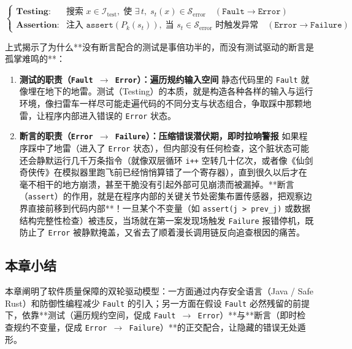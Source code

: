 \documentclass[a4paper]{article}
\begin{document}
\begin{equation}
\begin{cases}
\textbf{Testing}: & \text{搜索 } x \in \mathcal{I}_{\mathrm{test}}, \;\text{使 } \exists\, t,\; s_t(x) \in \mathcal{S}_{\mathrm{error}} \quad (\mathtt{Fault \to Error}) \\[6pt]
\textbf{Assertion}: & \text{注入 } \mathtt{assert}(P_k(s_t)), \;\text{当 } s_t \in \mathcal{S}_{\mathrm{error}} \text{ 时触发异常} \quad (\mathtt{Error \to Failure})
\end{cases}
\end{equation}

上式揭示了为什么**没有断言配合的测试是事倍功半的，而没有测试驱动的断言是孤掌难鸣的**：
\begin{enumerate}
    \item \textbf{测试的职责（\texttt{Fault $\to$ Error}）：遍历规约输入空间}
    静态代码里的 \texttt{Fault} 就像埋在地下的地雷。测试（Testing）的本质，就是构造各种各样的输入与运行环境，像扫雷车一样尽可能走遍代码的不同分支与状态组合，争取踩中那颗地雷，让程序内部进入错误的 \texttt{Error} 状态。
    \item \textbf{断言的职责（\texttt{Error $\to$ Failure}）：压缩错误潜伏期，即时拉响警报}
    如果程序踩中了地雷（进入了 \texttt{Error} 状态），但内部没有任何检查，这个脏状态可能还会静默运行几千万条指令（就像双层循环 \texttt{i++} 空转几十亿次，或者像《仙剑奇侠传》在模拟器里跑飞前已经悄悄算错了一个寄存器），直到很久以后才在毫不相干的地方崩溃，甚至干脆没有引起外部可见崩溃而被漏掉。**断言（\texttt{assert}）的作用，就是在程序内部的关键关节处密集布置传感器，把观察边界直接前移到代码内部**！一旦某个不变量（如 \texttt{assert(j > prev\_j)} 或数据结构完整性检查）被违反，当场就在第一案发现场触发 \texttt{Failure} 报错停机，既防止了 \texttt{Error} 被静默掩盖，又省去了顺着漫长调用链反向追查根因的痛苦。
\end{enumerate}

\subsection{本章小结}

本章阐明了软件质量保障的双轮驱动模型：一方面通过内存安全语言（Java / Safe Rust）和防御性编程减少 \texttt{Fault} 的引入；另一方面在假设 \texttt{Fault} 必然残留的前提下，依靠**测试（遍历规约空间，促成 \texttt{Fault $\to$ Error}）**与**断言（即时检查规约不变量，促成 \texttt{Error $\to$ Failure}）**的正交配合，让隐藏的错误无处遁形。
\end{document}
